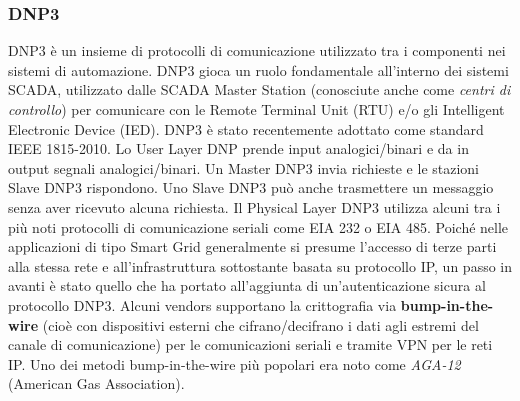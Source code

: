 \subsubsection{DNP3}
DNP3 è un insieme di protocolli di comunicazione utilizzato tra i componenti nei sistemi di automazione. DNP3 gioca un ruolo fondamentale all'interno dei sistemi SCADA, utilizzato dalle SCADA Master Station (conosciute anche come \emph{centri di controllo}) per comunicare con le Remote Terminal Unit (RTU) e/o gli Intelligent Electronic Device (IED). DNP3 è stato recentemente adottato come standard IEEE 1815-2010\cite{dnp}. Lo User Layer DNP prende input analogici/binari e da in output segnali analogici/binari. Un Master DNP3 invia richieste e le stazioni Slave DNP3 rispondono. Uno Slave DNP3 può anche trasmettere un messaggio senza aver ricevuto alcuna richiesta. Il Physical Layer DNP3 utilizza alcuni tra i più noti protocolli di comunicazione seriali come EIA 232 o EIA 485.
\newline\newline
Poiché nelle applicazioni di tipo Smart Grid generalmente si presume l'accesso di terze parti alla stessa rete e all'infrastruttura sottostante basata su protocollo IP, un passo in avanti è stato quello che ha portato all'aggiunta di un'autenticazione sicura al protocollo DNP3. Alcuni vendors supportano la crittografia via \textbf{bump-in-the-wire} (cioè con dispositivi esterni che cifrano/decifrano i dati agli estremi del canale di comunicazione) per le comunicazioni seriali e tramite VPN per le reti IP. Uno dei metodi bump-in-the-wire più popolari era noto come \emph{AGA-12} (American Gas Association).
